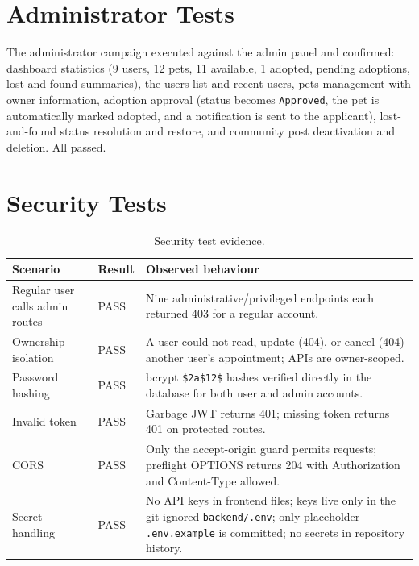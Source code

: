 \section{Administrator Tests}

The administrator campaign executed against the admin panel and confirmed:
dashboard statistics (9 users, 12 pets, 11 available, 1 adopted, pending
adoptions, lost-and-found summaries), the users list and recent users, pets
management with owner information, adoption approval (status becomes
\texttt{Approved}, the pet is automatically marked adopted, and a notification
is sent to the applicant), lost-and-found status resolution and restore, and
community post deactivation and deletion. All passed.

\section{Security Tests}

\begin{center}
\begin{longtable}{@{}p{3.6cm}p{3.4cm}p{7.6cm}@{}}
\caption{Security test evidence.}
\label{tab:security-tests}\\
\toprule
\textbf{Scenario} & \textbf{Result} & \textbf{Observed behaviour} \\
\midrule
Regular user calls admin routes & PASS & Nine administrative/privileged
endpoints each returned 403 for a regular account. \\
Ownership isolation & PASS & A user could not read, update (404), or cancel
(404) another user's appointment; APIs are owner-scoped. \\
Password hashing & PASS & bcrypt \texttt{\$2a\$12\$} hashes verified directly in
the database for both user and admin accounts. \\
Invalid token & PASS & Garbage JWT returns 401; missing token returns 401 on
protected routes. \\
CORS & PASS & Only the accept-origin guard permits requests; preflight OPTIONS
returns 204 with Authorization and Content-Type allowed. \\
Secret handling & PASS & No API keys in frontend files; keys live only in the
git-ignored \texttt{backend/.env}; only placeholder \texttt{.env.example} is
committed; no secrets in repository history. \\
\bottomrule
\end{longtable}
\end{center}

